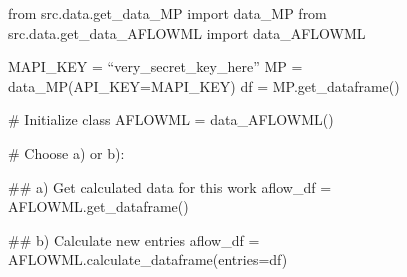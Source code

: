 from src.data.get_data_MP import data_MP
from src.data.get_data_AFLOWML import data_AFLOWML

MAPI_KEY = ``very_secret_key_here''
MP = data_MP(API_KEY=MAPI_KEY)
df = MP.get_dataframe()

# Initialize class
AFLOWML = data_AFLOWML()

# Choose a) or b):

## a) Get calculated data for this work
aflow_df = AFLOWML.get_dataframe()

## b) Calculate new entries
aflow_df = AFLOWML.calculate_dataframe(entries=df)
